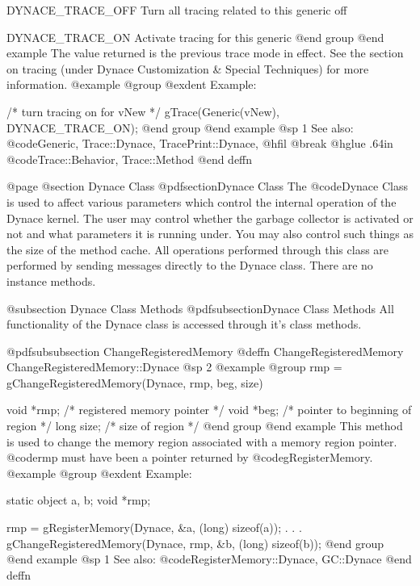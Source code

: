 DYNACE_TRACE_OFF         Turn all tracing related to this
                         generic off

DYNACE_TRACE_ON          Activate tracing for this generic
@end group
@end example
The value returned is the previous trace mode in effect.  See the
section on tracing (under Dynace Customization & Special Techniques) for
more information.
@example
@group
@exdent Example:

/* turn tracing on for vNew */
gTrace(Generic(vNew), DYNACE_TRACE_ON); 
@end group
@end example
@sp 1
See also:  @code{Generic, Trace::Dynace, TracePrint::Dynace,}
@hfil @break @hglue .64in @code{Trace::Behavior, Trace::Method}
@end deffn















@page
@section Dynace Class
@pdfsection{Dynace Class}
The @code{Dynace} Class is used to affect various parameters which control
the internal operation of the Dynace kernel.  The user may control whether
the garbage collector is activated or not and what parameters it is
running under.  You may also control such things as the size of the
method cache.  All operations performed through this class are performed
by sending messages directly to the Dynace class.  There are no instance
methods.


@subsection Dynace Class Methods
@pdfsubsection{Dynace Class Methods}
All functionality of the Dynace class is accessed through it's class methods.







@pdfsubsubsection {ChangeRegisteredMemory}
@deffn {ChangeRegisteredMemory} ChangeRegisteredMemory::Dynace
@sp 2
@example
@group
rmp = gChangeRegisteredMemory(Dynace, rmp, beg, size)

void    *rmp;   /*  registered memory pointer  */
void    *beg;   /*  pointer to beginning of region  */
long    size;   /*  size of region  */
@end group
@end example
This method is used to change the memory region associated with
a memory region pointer.  @code{rmp} must have been a pointer returned by
@code{gRegisterMemory}.
@example
@group
@exdent Example:

static  object  a, b;
void    *rmp;

rmp = gRegisterMemory(Dynace, &a, (long) sizeof(a));
   .
   .
   .
gChangeRegisteredMemory(Dynace, rmp, &b, (long) sizeof(b));
@end group
@end example
@sp 1
See also:  @code{RegisterMemory::Dynace, GC::Dynace}
@end deffn







